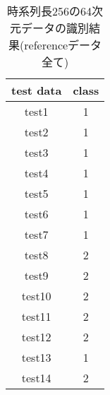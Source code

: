         \begin{table}[]
            \centering
            \caption{時系列長256の64次元データの識別結果(referenceデータ全て)}
            \begin{tabular}{|c|c|}
                \hline
                test data & class \\ \hline
                test1      & 1     \\ \hline
                test2      & 1     \\ \hline
                test3      & 1     \\ \hline
                test4      & 1     \\ \hline
                test5      & 1     \\ \hline
                test6      & 1     \\ \hline
                test7      & 1     \\ \hline
                test8      & 2     \\ \hline
                test9      & 2     \\ \hline
                test10     & 2     \\ \hline
                test11     & 2     \\ \hline
                test12     & 2     \\ \hline
                test13     & 1     \\ \hline
                test14     & 2     \\ \hline
            \end{tabular}
            \label{tb:result4-2}
        \end{table}


